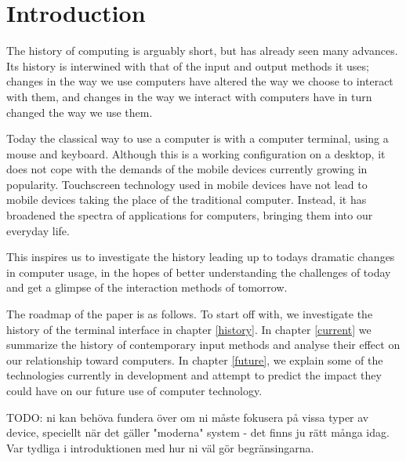 
\section{Introduction}

The history of computing is arguably short, but has already seen many advances. Its history is interwined with that of the input and output methods it uses; changes in the way we use computers have altered the way we choose to interact with them, and changes in the way we interact with computers have in turn changed the way we use them.

Today the classical way to use a computer is with a computer terminal, using a mouse and keyboard. Although this is a working configuration on a desktop, it does not cope with the demands of the mobile devices currently growing in popularity. Touchscreen technology used in mobile devices have not lead to mobile devices taking the place of the traditional computer. Instead, it has broadened the spectra of applications for computers, bringing them into our everyday life.

This inspires us to investigate the history leading up to todays dramatic changes in computer usage, in the hopes of better understanding the challenges of today and get a glimpse of the interaction methods of tomorrow.



The roadmap of the paper is as follows. To start off with, we investigate the history of the terminal interface in chapter \ref{history}. In chapter \ref{current} we summarize the history of contemporary input methods and analyse their effect on our relationship toward computers. In chapter \ref{future}, we explain some of the technologies currently in development and attempt to predict the impact they could have on our future use of computer technology.


TODO: ni kan behöva fundera över om ni måste fokusera på vissa typer av device, speciellt när det gäller "moderna" system - det finns ju rätt många idag. Var tydliga i introduktionen med hur ni väl gör begränsingarna. 

